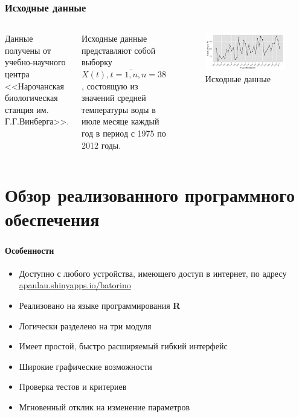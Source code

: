 \documentclass[10pt,pdf,aspectratio=169,hyperref={unicode},notheorems]{beamer}
\theoremstyle{definition}
\theoremstyle{example}
\theoremstyle{plain}
\begin{document}
\begin{frame}
  \frametitle{Исходные данные}
  \begin{columns}[c]
  \column{2in}
  Данные получены от учебно-научного центра <<Нарочанская биологическая станция им. Г.Г.Винберга>>.

  \vspace{0.5em}

  Исходные данные представляют собой выборку $ X(t), t = \overline{1,n}, n = 38 $, состоящую из значений средней температуры воды в июле месяце каждый год в период с 1975 по 2012 годы.
  \column{4in}
  \begin{figure}[h]
    \includegraphics[width=1\linewidth]{../../figures/source.png}
    \caption{Исходные данные}
  \end{figure}
  \end{columns}
\end{frame}

\section{Обзор реализованного программного обеспечения}

\begin{frame}
  \frametitle{\large\secname}
  \framesubtitle{Особенности}
  \begin{itemize}
    \item Доступно с любого устройства, имеющего доступ в интернет, по адресу \href{https://apaulau.shinyapps.io/batorino}{apaulau.shinyapps.io/batorino}
    \item Реализовано на языке программирования \textbf{R}
    \item Логически разделено на три модуля
    \item Имеет простой, быстро расширяемый гибкий интерфейс
    \item Широкие графические возможности
    \item Проверка тестов и критериев
    \item Мгновенный отклик на изменение параметров
  \end{itemize}
\end{frame}
\end{document}
